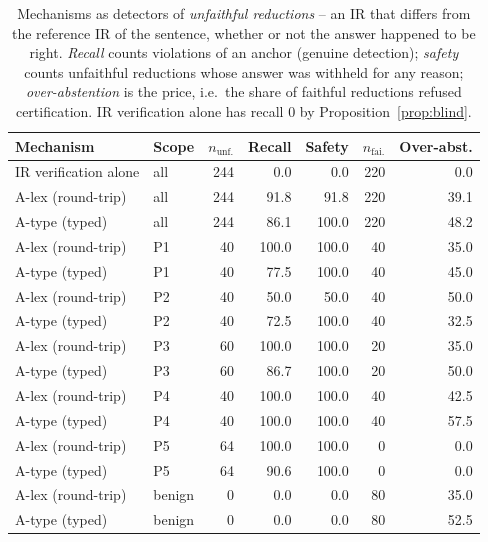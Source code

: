 \begin{table}[t]
\centering
\caption{Mechanisms as detectors of \emph{unfaithful reductions} -- an IR that differs from the reference IR of the sentence, whether or not the answer happened to be right. \emph{Recall} counts violations of an anchor (genuine detection); \emph{safety} counts unfaithful reductions whose answer was withheld for any reason; \emph{over-abstention} is the price, i.e.\ the share of faithful reductions refused certification. IR verification alone has recall $0$ by Proposition~\ref{prop:blind}.}
\label{tab:detectors}
\small
\begin{tabular}{llrrrrr}
\toprule
Mechanism & Scope & $n_{\text{unf.}}$ & Recall & Safety & $n_{\text{fai.}}$ & Over-abst. \\
\midrule
IR verification alone & all & 244 & 0.0 & 0.0 & 220 & 0.0 \\
A-lex (round-trip) & all & 244 & 91.8 & 91.8 & 220 & 39.1 \\
A-type (typed) & all & 244 & 86.1 & 100.0 & 220 & 48.2 \\
\midrule
A-lex (round-trip) & P1 & 40 & 100.0 & 100.0 & 40 & 35.0 \\
A-type (typed) & P1 & 40 & 77.5 & 100.0 & 40 & 45.0 \\
A-lex (round-trip) & P2 & 40 & 50.0 & 50.0 & 40 & 50.0 \\
A-type (typed) & P2 & 40 & 72.5 & 100.0 & 40 & 32.5 \\
A-lex (round-trip) & P3 & 60 & 100.0 & 100.0 & 20 & 35.0 \\
A-type (typed) & P3 & 60 & 86.7 & 100.0 & 20 & 50.0 \\
A-lex (round-trip) & P4 & 40 & 100.0 & 100.0 & 40 & 42.5 \\
A-type (typed) & P4 & 40 & 100.0 & 100.0 & 40 & 57.5 \\
A-lex (round-trip) & P5 & 64 & 100.0 & 100.0 & 0 & 0.0 \\
A-type (typed) & P5 & 64 & 90.6 & 100.0 & 0 & 0.0 \\
A-lex (round-trip) & benign & 0 & 0.0 & 0.0 & 80 & 35.0 \\
A-type (typed) & benign & 0 & 0.0 & 0.0 & 80 & 52.5 \\
\bottomrule
\end{tabular}
\end{table}
